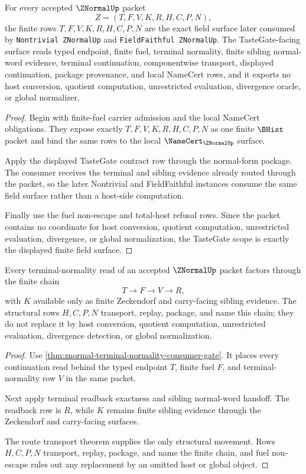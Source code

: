 \begin{theorem}
\label{thm:znormal-tastegate-scope-binding}
For every accepted $\ZNormalUp$ packet
$$
Z=(T,F,V,K,R,H,C,P,N),
$$
the finite rows $T,F,V,K,R,H,C,P,N$ are the exact field surface later consumed
by \texttt{Nontrivial ZNormalUp} and \texttt{FieldFaithful ZNormalUp}. The
TasteGate-facing surface reads typed endpoint, finite fuel, terminal
normality, finite sibling normal-word evidence, terminal continuation,
componentwise transport, displayed continuation, package provenance, and local
NameCert rows, and it exports no host conversion, quotient computation,
unrestricted evaluation, divergence oracle, or global normalizer.
\end{theorem}
\begin{proof}
Begin with finite-fuel carrier admission and the local NameCert obligations.
They expose exactly $T,F,V,K,R,H,C,P,N$ as one finite $\BHist$ packet and bind
the same rows to the local $\NameCert_{\ZNormalUp}$ surface.

Apply the displayed TasteGate contract row through the normal-form package. The
consumer receives the terminal and sibling evidence already routed through the
packet, so the later Nontrivial and FieldFaithful instances consume the same
field surface rather than a host-side computation.

Finally use the fuel non-escape and total-host refusal rows. Since the packet
contains no coordinate for host conversion, quotient computation, unrestricted
evaluation, divergence, or global normalization, the TasteGate scope is exactly
the displayed finite field surface.
\end{proof}

\begin{theorem}
\label{thm:znormal-terminal-fuel-field-scope}
Every terminal-normality read of an accepted $\ZNormalUp$ packet factors
through the finite chain
$$
T \to F \to V \to R,
$$
with $K$ available only as finite Zeckendorf and carry-facing sibling evidence.
The structural rows $H,C,P,N$ transport, replay, package, and name this chain;
they do not replace it by host conversion, quotient computation, unrestricted
evaluation, divergence detection, or global normalization.
\end{theorem}
\begin{proof}
Use \autoref{thm:znormal-terminal-normality-consumer-gate}. It places every
continuation read behind the typed endpoint $T$, finite fuel $F$, and
terminal-normality row $V$ in the same packet.

Next apply terminal readback exactness and sibling normal-word handoff. The
readback row is $R$, while $K$ remains finite sibling evidence through the
Zeckendorf and carry-facing surfaces.

The route transport theorem supplies the only structural movement. Rows
$H,C,P,N$ transport, replay, package, and name the finite chain, and fuel
non-escape rules out any replacement by an omitted host or global object.
\end{proof}

